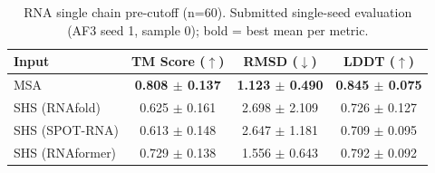 \begin{table}[htbp]
\centering
\caption{RNA single chain pre-cutoff (n=60). Submitted single-seed evaluation (AF3 seed 1, sample 0); bold = best mean per metric.}
\label{tab:rna_single_chain_pre_cutoff}
\begin{tabular}{lccc}
\toprule
Input & TM Score ($\uparrow$) & RMSD ($\downarrow$) & LDDT ($\uparrow$) \\
\midrule
MSA & \textbf{0.808 $\pm$ 0.137} & \textbf{1.123 $\pm$ 0.490} & \textbf{0.845 $\pm$ 0.075} \\
SHS (RNAfold) & 0.625 $\pm$ 0.161 & 2.698 $\pm$ 2.109 & 0.726 $\pm$ 0.127 \\
SHS (SPOT-RNA) & 0.613 $\pm$ 0.148 & 2.647 $\pm$ 1.181 & 0.709 $\pm$ 0.095 \\
SHS (RNAformer) & 0.729 $\pm$ 0.138 & 1.556 $\pm$ 0.643 & 0.792 $\pm$ 0.092 \\
\bottomrule
\end{tabular}
\end{table}
